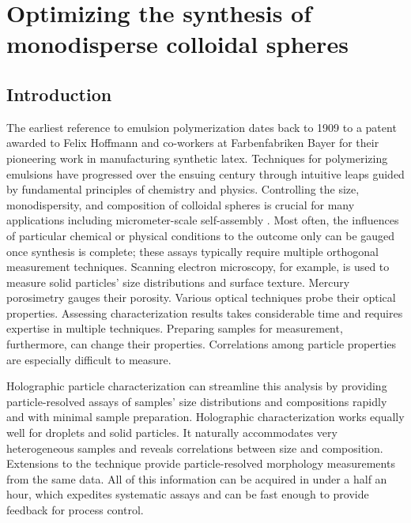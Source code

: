 \chapter{Optimizing the synthesis of monodisperse colloidal spheres}
\label{ch:synthesis}

\section{Introduction}

The earliest reference to emulsion polymerization dates back to
1909 \cite{bayer1909,finch03} to a patent awarded to Felix Hoffmann and
co-workers at Farbenfabriken Bayer for their pioneering work in manufacturing
synthetic latex.
Techniques for polymerizing emulsions have progressed  over the ensuing century
through intuitive leaps guided by fundamental principles of chemistry
and physics.  Controlling the size, monodispersity, and composition of
colloidal spheres is crucial for many applications including micrometer-scale
self-assembly \cite{pusey87,sacanna11}. Most often, the influences of particular chemical
or physical conditions to the outcome only can be gauged once
synthesis is complete; these assays typically require multiple orthogonal measurement
techniques.
Scanning electron microscopy, for example, is used to measure solid particles'
size distributions and surface texture. Mercury porosimetry gauges their
porosity. Various optical techniques probe their optical properties.
Assessing characterization results takes considerable time and requires
expertise in multiple techniques. Preparing samples for measurement,
furthermore, can change their properties. Correlations among particle
properties are especially difficult to measure.

Holographic particle characterization can streamline this analysis by providing
particle-resolved assays of samples' size distributions and compositions rapidly and with
minimal sample preparation. Holographic characterization works equally
well for droplets and solid particles. It naturally accommodates very heterogeneous
samples and reveals correlations between size and composition. Extensions to the technique
provide particle-resolved morphology measurements from the same data. All of this information
can be acquired in under a half an hour, which expedites systematic assays and can be
fast enough to provide feedback for process control.


